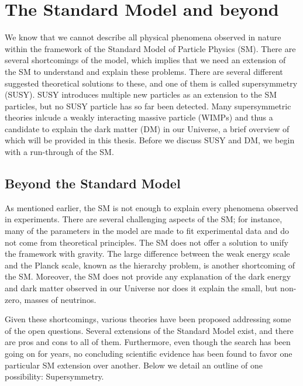 \chapter{The Standard Model and beyond}
\label{sec:Theory}
We know that we cannot describe all physical phenomena observed in nature within the framework of the Standard Model of Particle Physics (SM). There are several shortcomings of the model, which implies that we need an extension of the SM to understand and explain these problems. There are several different suggested theoretical solutions to these, and one of them is called supersymmetry (SUSY). SUSY introduces multiple new particles as an extension to the SM particles, but no SUSY particle has so far been detected. Many supersymmetric theories inlcude a weakly interacting massive particle (WIMPs) and thus a candidate to explain the dark matter (DM) in our Universe, a brief overview of which will be provided in this thesis. Before we discuss SUSY and DM, we begin with a run-through of the SM.



\section{Beyond the Standard Model}
As mentioned earlier, the SM is not enough to explain every phenomena observed in experiments. There are several challenging aspects of the SM; for instance, many of the parameters in the model are made to fit experimental data and do not come from theoretical principles. 
The SM does not offer a solution to unify the framework with gravity. The large difference between the weak energy scale and the Planck scale, known as the hierarchy problem, is another shortcoming of the SM. Moreover, the SM does not provide any explanation of the dark energy and dark matter observed in our Universe nor does it explain the small, but non-zero, masses of neutrinos.  

Given these shortcomings, various theories have been proposed addressing some of the open questions. Several extensions of the Standard Model exist, and there are pros and cons to all of them. Furthermore, even though the search has been going on for years, no concluding scientific evidence has been found to favor one particular SM extension over another. Below we detail an outline of one possibility: Supersymmetry.



